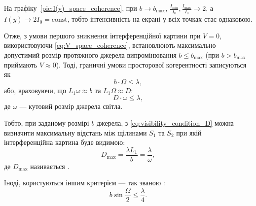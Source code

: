 На графіку~\ref{pic:I(y)_space_coherence}, при $ b \to b_{\max} $, $ \frac{I_{\min}}{I_0}, \frac{I_{\max}}{I_0} \to 2 $, а $ I(y) \to 2I_0 = \mathrm{const} $, тобто інтенсивність на екрані у всіх точках стає однаковою.

Отже, з умови першого зникнення інтерференційної картини при $ V=0 $, використовуючи  \eqref{eq:V_space_coherence}, встановлюють максимально допустимий розмір протяжного джерела випромінювання $ b \le b_{\max} $ (при $ b > b_{\max} $ приймають $ V \approx 0 $). Тоді, граничні умови просторової когерентності записуються як
\begin{equation}\label{eq:visibility_condition_b}
	b \cdot \Omega \le  \lambda,
\end{equation}
або, враховуючи, що $ L_1 \omega  \approx b $ та $ L_1\Omega \approx D $:
\begin{equation}\label{eq:visibility_condition_D}
    D \cdot \omega \le \lambda,  \tag{\theequation$\prime$}
\end{equation}
де $ \omega $ ---  кутовий розмір джерела світла.

Тобто, при заданому розмірі $ b $ джерела, з \eqref{eq:visibility_condition_D} можна визначити максимальну відстань між щілинами $ S_1 $ та $ S_2 $ при якій інтерференційна картина буде видимою:
\begin{equation}\label{eq:d_coherence}
	 D_{\max} = \frac{\lambda L_1}{b} = \frac{\lambda}{\omega},
\end{equation}
де $ D_{\max} $ називається .

Іноді, користуються іншим критерієм --- так званою :
\begin{equation}\label{eq:good_vis}
    b\sin\frac\Omega2 \le \frac{\lambda}{4}.
\end{equation}



